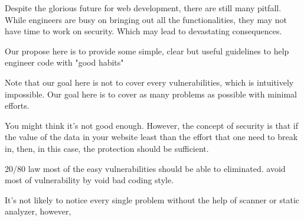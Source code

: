 \documentclass[conference]{IEEEtran}
\begin{document}
Despite the glorious future for web development, there are still many pitfall. While engineers are busy on bringing out all the functionalities, they may not have time to work on security. Which may lead to devastating consequences. 

Our propose here is to provide some simple, clear but useful guidelines to help engineer code with "good habits"

Note that our goal here is not to cover every vulnerabilities, which is intuitively impossible. Our goal here is to cover as many problems as possible with minimal efforts.

You might think it's not good enough. However, the concept of security is that if the value of the data in your website least than the effort that one need to break in, then, in this case, the protection should be sufficient.

20/80 law most of the easy vulnerabilities should be able to eliminated. avoid most of vulnerability by void bad coding style.

It's not likely to notice every single problem without the help of scanner or static analyzer, however,

\end{document}
